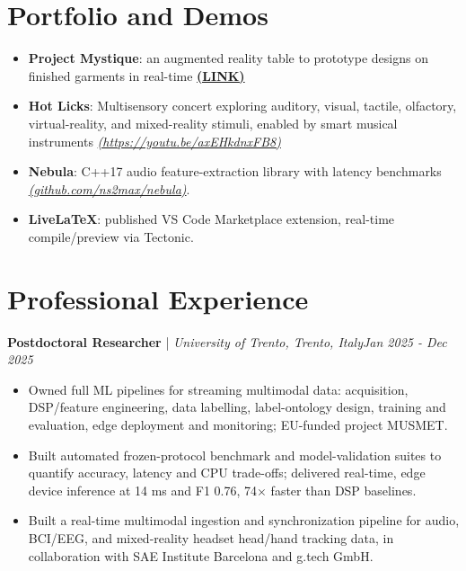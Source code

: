 \documentclass[11pt]{article}
\newenvironment{cvrole}[5]{%
  \par\noindent\textbf{\large #1} | \textit{\small #2, #3}\hfill \textit{\small #4 - #5}\par
  \begin{itemize}[leftmargin=2em, itemsep=-0.3em, topsep=-0.5em]%
}{%
  \end{itemize}\par\noindent\mbox{}\par\vspace{0.1em}%
}
\begin{document}
\section*{Portfolio and Demos \footnotesize {}}
\begin{itemize}[leftmargin=1.2em, itemsep=-0.25em]
    \item \textbf{Project Mystique}: an augmented reality table to prototype designs on finished garments in real-time \href{https://nishal.xyz/research#:~:text=Smart%20Prototyping%20for%20Garment%20Prints}{{\textbf{{(LINK)}}}}
    \item \textbf{Hot Licks}: Multisensory concert exploring auditory, visual, tactile, olfactory, virtual-reality, and mixed-reality stimuli, enabled by smart musical instruments \href{https://youtu.be/axEHkdnxFB8}{\textit{(https://youtu.be/axEHkdnxFB8)}}
    \item \textbf{Nebula}: C++17 audio feature-extraction library with latency benchmarks  \href{https://github.com/ns2max/nebula}{\textit{(github.com/ns2max/nebula)}}.
    \item \textbf{LiveLaTeX}: published VS Code Marketplace extension, real-time compile/preview via Tectonic.
\end{itemize}

\section*{Professional Experience}

\begin{cvrole}{Postdoctoral Researcher}{University of Trento}{Trento, Italy}{Jan 2025}{Dec 2025}
    \item Owned full ML pipelines for streaming multimodal data: acquisition, DSP/feature engineering, data labelling, label-ontology design, training and evaluation, edge deployment and monitoring; EU-funded project MUSMET.
    \item Built automated frozen-protocol benchmark and model-validation suites to quantify accuracy, latency and CPU trade-offs; delivered real-time, edge device inference at 14 ms and F1 0.76, 74$\times$ faster than DSP baselines.
    \item Built a real-time multimodal ingestion and synchronization pipeline for audio, BCI/EEG, and mixed-reality headset head/hand tracking data, in collaboration with SAE Institute Barcelona and g.tech GmbH.
\end{cvrole}
\end{document}
